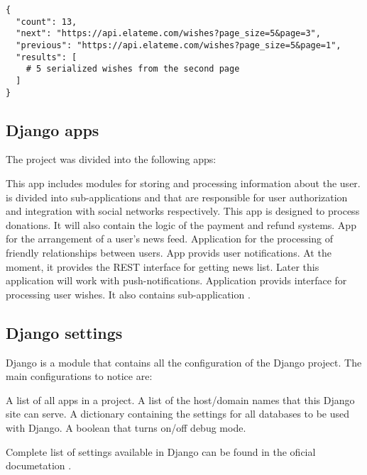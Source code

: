 \begin{lstlisting}
{
  "count": 13,
  "next": "https://api.elateme.com/wishes?page_size=5&page=3",
  "previous": "https://api.elateme.com/wishes?page_size=5&page=1",
  "results": [
    # 5 serialized wishes from the second page
  ]
}
\end{lstlisting}


\subsection{Django apps}
The project was divided into the following apps:

\begin{itemize}

 This app includes modules for storing and processing information about the user.  is
divided into sub-applications  and  that are responsible for user authorization and
integration with social networks respectively.
 This app is designed to process donations. It will also contain the logic of the payment and refund
systems.
 App for the arrangement of a user's news feed.
 Application for the processing of friendly relationships between users.
 App provids user notifications. At the moment, it provides the REST interface for getting news
list. Later this application will work with push-notifications.
 Application provids interface for processing user wishes. It also contains sub-application .

\end{itemize}

\subsection{Django settings}
Django  is a module that contains all the configuration of the Django project. The main configurations
to notice are:

\begin{itemize}
     A list of all apps in a project.
     A list of the host/domain names that this Django site can serve.
     A dictionary containing the settings for all databases to be used with Django.
     A boolean that turns on/off debug mode.
\end{itemize}

Complete list of settings available in Django can be found in the oficial documetation \cite{djangosettings}.

